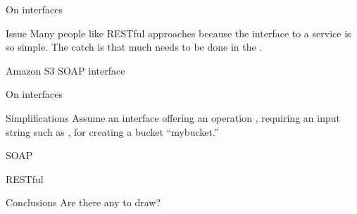   \begin{slide}{On interfaces}
    \begin{alertblock}{Issue}
      Many people like RESTful approaches because the interface to a service is so simple. The catch is that
      much needs to be done in the .
    \end{alertblock}
    \begin{block}{Amazon S3 SOAP interface}
      \begin{centerfig}
      \end{centerfig}
    \end{block}
  \end{slide}
  \begin{slide}{On interfaces}
    \begin{block}{Simplifications}
      Assume an interface  offering an operation , requiring an
      input string such as , for creating a bucket ``mybucket.''
    \end{block}
    \begin{exampleblock}{SOAP}
      \begin{quote}
         \newline
      \end{quote}
    \end{exampleblock}
    \begin{exampleblock}{RESTful}
      \begin{quote}
      \end{quote}
    \end{exampleblock}
    \begin{block}{Conclusions}
      Are there any to draw?
    \end{block}
  \end{slide}
